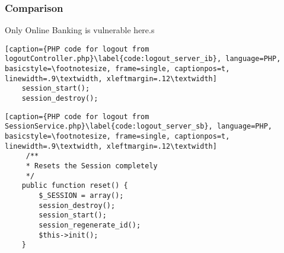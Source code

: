 \subsubsection{Comparison}
Only Online Banking is vulnerable here.s
\clearpage

\begin{lstlisting}[caption={PHP code for logout from logoutController.php}\label{code:logout_server_ib}, language=PHP, basicstyle=\footnotesize, frame=single, captionpos=t, linewidth=.9\textwidth, xleftmargin=.12\textwidth]
    session_start();
    session_destroy();
\end{lstlisting}

\begin{lstlisting}[caption={PHP code for logout from SessionService.php}\label{code:logout_server_sb}, language=PHP, basicstyle=\footnotesize, frame=single, captionpos=t, linewidth=.9\textwidth, xleftmargin=.12\textwidth]
     /**
     * Resets the Session completely
     */
    public function reset() {
        $_SESSION = array();
        session_destroy();
        session_start();
        session_regenerate_id();
        $this->init();
    }
\end{lstlisting}